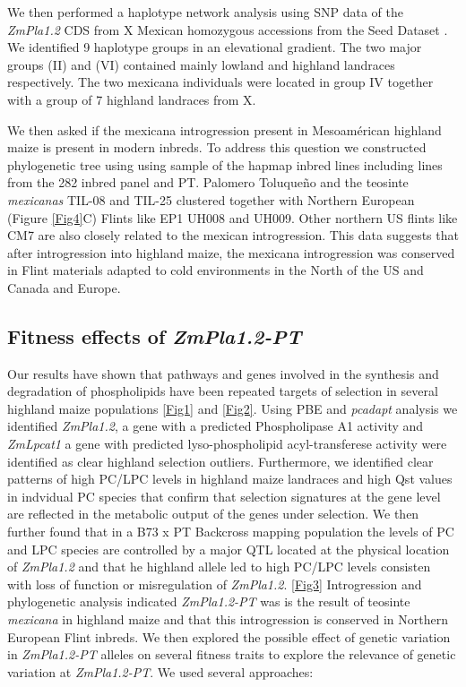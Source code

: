 \documentclass[9pt,twocolumn,twoside]{BioRxiv}
\begin{document}
We then performed a haplotype network analysis using SNP data of the \textit{ZmPla1.2} CDS from X Mexican homozygous accessions from the Seed Dataset \cite{Romero_Navarro2017-cn}. We identified 9 haplotype groups in an elevational gradient. The two major groups (II) and (VI) contained mainly lowland and highland landraces respectively. The two mexicana individuals were located in group IV together with a group of 7 highland landraces from X. 

We then asked if the mexicana introgression present in Mesoamérican highland maize is present in modern inbreds. To address this question we constructed phylogenetic tree using using sample of the hapmap inbred lines including lines from the 282 inbred panel and PT. Palomero Toluqueño and the teosinte \textit{mexicanas} TIL-08 and TIL-25 clustered together with Northern European (Figure \ref{Fig4}C) Flints like EP1 UH008 and UH009. Other northern US flints like CM7 are also closely related to the mexican introgression. This data suggests that after introgression into highland maize, the mexicana introgression was conserved in Flint materials adapted to cold environments in the North of the US and Canada and Europe. 

\subsection{Fitness effects of \textit{ZmPla1.2-PT}}

Our results have shown that pathways and genes involved in the synthesis and degradation of phospholipids have been repeated targets of selection in several highland maize populations \ref{Fig1} and \ref{Fig2}. 
Using PBE and \textit{pcadapt} analysis we identified \textit{ZmPla1.2}, a gene with a predicted Phospholipase A1 activity and \textit{ZmLpcat1} a gene with predicted lyso-phospholipid acyl-transferese activity were identified as clear highland selection outliers. 
Furthermore, we identified clear patterns of high PC/LPC levels in highland maize landraces and high Qst values in indvidual PC species that confirm that selection signatures at the gene level are reflected in the metabolic output of the genes under selection. 
We then further found that in a B73 x PT Backcross mapping population the levels of PC and LPC species are controlled by a major QTL located at the physical location of \textit{ZmPla1.2} and that he highland allele led to high PC/LPC levels consisten with loss of function or misregulation of \textit{ZmPla1.2}. \ref{Fig3}  Introgression and phylogenetic analysis indicated \textit{ZmPla1.2-PT} was is the result of teosinte \textit{mexicana} in highland maize and that this introgression is conserved in Northern European Flint inbreds.
We then explored the possible effect of genetic variation in \textit{ZmPla1.2-PT} alleles on several fitness traits to explore the relevance of genetic variation at \textit{ZmPla1.2-PT}. We used several approaches:
\end{document}

